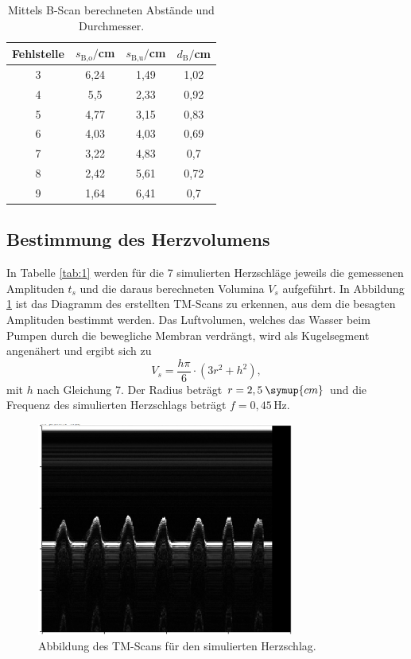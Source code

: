 \begin{table}[H]
  \centering
  \caption{Mittels B-Scan berechneten Abstände und Durchmesser.}
  \begin{tabular}{c c c c}
    \toprule
  Fehlstelle & $s_\text{B,o}/$cm & $s_\text{B,u}/$cm & $d_\text{B}/$cm\\
    \midrule
    3   & 6,24 & 1,49  & 1,02   \\
    4   & 5,5  & 2,33  & 0,92   \\
    5   & 4,77 & 3,15  & 0,83   \\
    6   & 4,03 & 4,03  & 0,69   \\
    7   & 3,22 & 4,83  & 0,7    \\
    8   & 2,42 & 5,61  & 0,72   \\
    9   & 1,64 & 6,41  & 0,7  \\
    \bottomrule
  \end{tabular}
\end{table}




\subsection{Bestimmung des Herzvolumens}
In Tabelle \ref{tab:1} werden für die 7 simulierten Herzschläge jeweils die gemessenen Amplituden $t_s$ und die daraus berechneten
Volumina $V_s$ aufgeführt. In Abbildung \ref{fig:TM} ist das Diagramm des erstellten TM-Scans zu erkennen, aus dem die besagten Amplituden
bestimmt werden. Das Luftvolumen, welches das Wasser beim Pumpen durch die bewegliche Membran verdrängt, wird als
Kugelsegment\cite{kent3} angenähert und ergibt sich zu
\begin{equation}
  V_s = \frac{h\pi}{6}\cdot(3r^2 + h^2),
\end{equation}
mit $h$ nach Gleichung 7.
Der Radius beträgt $r = 2,5 \: \symup{cm}$ und die Frequenz des simulierten
Herzschlags beträgt $f = 0,45\,\si{\hertz}$.

\begin{figure}[H]
  \centering
  \includegraphics[height=7cm]{tm-herz.png}
  \caption{Abbildung des TM-Scans für den simulierten Herzschlag.}
  \label{fig:TM}
\end{figure}


